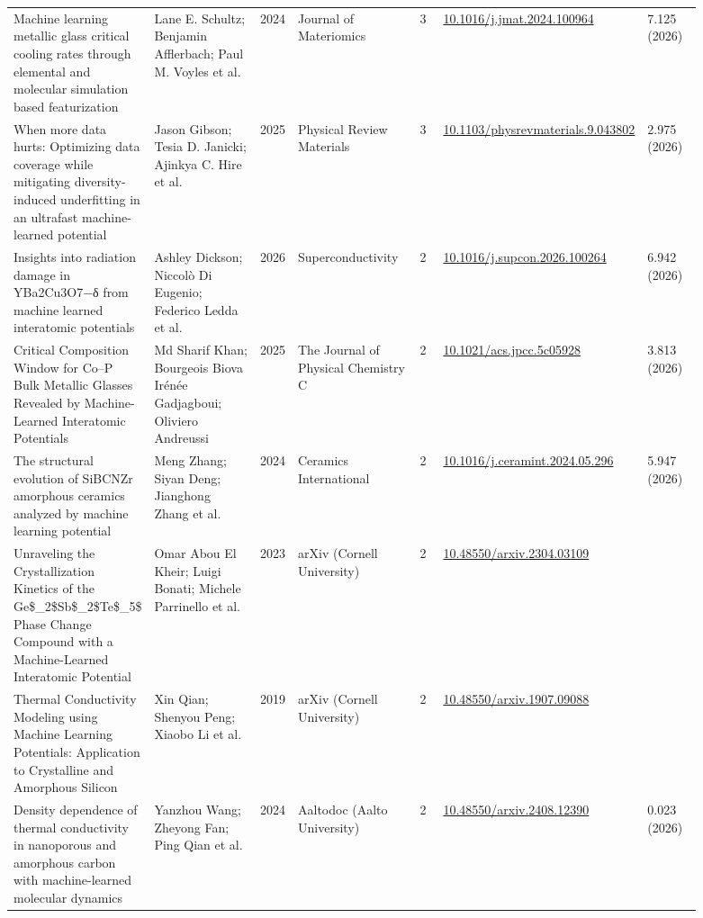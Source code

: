 \documentclass[10pt,a4paper]{article}
\begin{document}
{\begin{longtable}{p{0.192\linewidth}p{0.192\linewidth}p{0.043\linewidth}p{0.192\linewidth}p{0.043\linewidth}p{0.132\linewidth}p{0.096\linewidth}}
Machine learning metallic glass critical cooling rates through elemental and molecular simulation based featurization & Lane E. Schultz; Benjamin Afflerbach; Paul M. Voyles et al. & 2024 & Journal of Materiomics & 3 & \href{https://doi.org/10.1016/j.jmat.2024.100964}{10.1016/j.jmat.2024.100964} & 7.125 (2026) \\
When more data hurts: Optimizing data coverage while mitigating diversity-induced underfitting in an ultrafast machine-learned potential & Jason Gibson; Tesia D. Janicki; Ajinkya C. Hire et al. & 2025 & Physical Review Materials & 3 & \href{https://doi.org/10.1103/physrevmaterials.9.043802}{10.1103/physrevmaterials.9.043802} & 2.975 (2026) \\
Insights into radiation damage in YBa2Cu3O7−δ from machine learned interatomic potentials & Ashley Dickson; Niccolò Di Eugenio; Federico Ledda et al. & 2026 & Superconductivity & 2 & \href{https://doi.org/10.1016/j.supcon.2026.100264}{10.1016/j.supcon.2026.100264} & 6.942 (2026) \\
Critical Composition Window for Co–P Bulk Metallic Glasses Revealed by Machine-Learned Interatomic Potentials & Md Sharif Khan; Bourgeois Biova Irénée Gadjagboui; Oliviero Andreussi & 2025 & The Journal of Physical Chemistry C & 2 & \href{https://doi.org/10.1021/acs.jpcc.5c05928}{10.1021/acs.jpcc.5c05928} & 3.813 (2026) \\
The structural evolution of SiBCNZr amorphous ceramics analyzed by machine learning potential & Meng Zhang; Siyan Deng; Jianghong Zhang et al. & 2024 & Ceramics International & 2 & \href{https://doi.org/10.1016/j.ceramint.2024.05.296}{10.1016/j.ceramint.2024.05.296} & 5.947 (2026) \\
Unraveling the Crystallization Kinetics of the Ge\$\_2\$Sb\$\_2\$Te\$\_5\$ Phase Change Compound with a Machine-Learned Interatomic Potential & Omar Abou El Kheir; Luigi Bonati; Michele Parrinello et al. & 2023 & arXiv (Cornell University) & 2 & \href{https://doi.org/10.48550/arxiv.2304.03109}{10.48550/arxiv.2304.03109} &  \\
Thermal Conductivity Modeling using Machine Learning Potentials: Application to Crystalline and Amorphous Silicon & Xin Qian; Shenyou Peng; Xiaobo Li et al. & 2019 & arXiv (Cornell University) & 2 & \href{https://doi.org/10.48550/arxiv.1907.09088}{10.48550/arxiv.1907.09088} &  \\
Density dependence of thermal conductivity in nanoporous and amorphous carbon with machine-learned molecular dynamics & Yanzhou Wang; Zheyong Fan; Ping Qian et al. & 2024 & Aaltodoc (Aalto University) & 2 & \href{https://doi.org/10.48550/arxiv.2408.12390}{10.48550/arxiv.2408.12390} & 0.023 (2026) \\

\end{longtable}}
\end{document}
